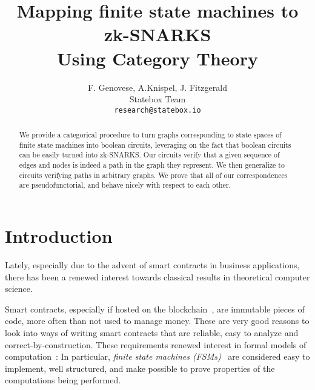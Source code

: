 \documentclass[preliminary,copyright,creativecommons,sharealike,noncommercial]{eptcs}
\title{Mapping finite state machines to zk-SNARKS \\ Using Category Theory}
\author{
	F. Genovese, A.Knispel, J. Fitzgerald \\
	Statebox Team\\
	\texttt{research@statebox.io}
}
\begin{document}
\maketitle
%
%
\begin{abstract}
  We provide a categorical procedure to turn graphs corresponding to 
  state spaces of finite state machines into boolean circuits, leveraging on the fact that 
  boolean circuits can be easily turned into zk-SNARKS. Our 
  circuits verify that a given sequence of edges and nodes is indeed a 
  path in the graph they represent. We then generalize to circuits verifying 
  paths in arbitrary graphs. We prove that all of our correspondences are 
  pseudofunctorial, and behave nicely with respect to each other.
\end{abstract}
%
%
%
\section{Introduction}\label{sec:introduction}
%
%
Lately, especially due to the advent of smart contracts 
in business applications, there has been a renewed interest towards 
classical results in theoretical computer science.

Smart contracts, especially if hosted on the blockchain~\cite{Nakamoto2008, Buterin2014}, are immutable
pieces of code, more often than not used to manage money. These are 
very good reasons to look into ways of writing smart contracts  
that are reliable, easy to analyze and correct-by-construction. These requirements
 renewed interest in formal models of computation~\cite{Rosu2018}: In particular, 
 \emph{finite state machines (FSMs)}~\cite{Mavridou2017} are considered easy 
 to implement, well structured, and make possible to prove 
 properties of the computations being performed. 
\end{document}
